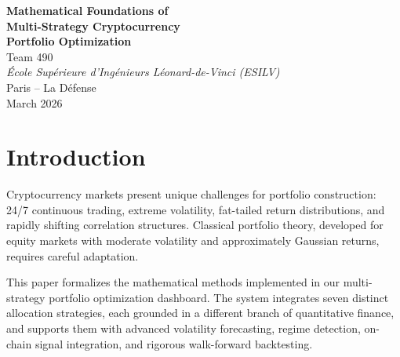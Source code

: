 \documentclass[12pt,a4paper]{article}
\begin{document}
\begin{titlepage}
\centering
\vspace*{2cm}
{\LARGE\bfseries Mathematical Foundations of\\[0.4em]
Multi-Strategy Cryptocurrency\\[0.4em]
Portfolio Optimization}\\[2cm]
{\large Team 490}\\[0.5cm]
{\large\textit{\'Ecole Sup\'erieure d'Ing\'enieurs L\'eonard-de-Vinci (ESILV)}}\\[0.3cm]
{\large Paris -- La D\'efense}\\[2cm]
{\large March 2026}\\[3cm]
\begin{abstract}
\noindent
This paper presents the complete mathematical framework underlying a modular cryptocurrency portfolio optimization system. We formalize seven allocation strategies---Equal Weight, Markowitz Mean-Variance Optimization, GARCH-Enhanced Global Minimum Variance, Hierarchical Risk Parity, Equal Risk Contribution, Mean-CVaR, Black-Litterman with on-chain signal views, and Regime-Aware allocation---alongside the volatility modeling (GJR-GARCH), regime detection (Gaussian Hidden Markov Models), risk analytics, and walk-forward backtesting methodology that support them. Each method is presented with full derivations, parameter definitions, and algorithmic descriptions. This document serves as the mathematical source of truth for all project deliverables.
\end{abstract}
\end{titlepage}

\tableofcontents
\newpage

\section{Introduction}
\label{sec:intro}

Cryptocurrency markets present unique challenges for portfolio construction: 24/7 continuous trading, extreme volatility, fat-tailed return distributions, and rapidly shifting correlation structures. Classical portfolio theory, developed for equity markets with moderate volatility and approximately Gaussian returns, requires careful adaptation.

This paper formalizes the mathematical methods implemented in our multi-strategy portfolio optimization dashboard. The system integrates seven distinct allocation strategies, each grounded in a different branch of quantitative finance, and supports them with advanced volatility forecasting, regime detection, on-chain signal integration, and rigorous walk-forward backtesting.
\end{document}
